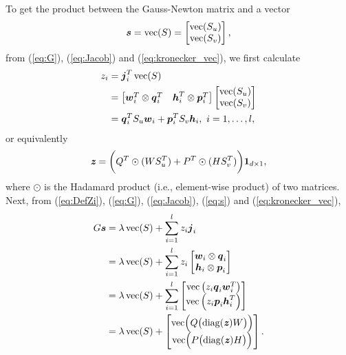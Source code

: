 To get the product between the Gauss-Newton matrix and a vector 
\begin{equation*}
\boldsymbol{s} = \operatorname*{vec}(S) = \begin{bmatrix}\operatorname*{vec}(S_u)\\ \operatorname*{vec}(S_v)\end{bmatrix}, 
\end{equation*}
from (\ref{eq:G}), (\ref{eq:Jacob}) and (\ref{eq:kronecker_vec}), we first calculate
\begin{equation}
\begin{aligned}
    z_i&= \boldsymbol{j}_i^T \operatorname*{vec}(S)\\
    &=\begin{bmatrix} \boldsymbol{w}_i^T\otimes\boldsymbol{q}_i^T & \boldsymbol{h}_i^T\otimes\boldsymbol{p}_i^T \end{bmatrix}\begin{bmatrix}\operatorname*{vec}(S_u)\\ \operatorname*{vec}(S_v)\end{bmatrix}\\
    &=\boldsymbol{q}_i^T S_u \boldsymbol{w}_i + \boldsymbol{p}_i^T S_v \boldsymbol{h}_i, \text{ }i=1,\dots,l
    \label{eq:DefZi},
\end{aligned}
\end{equation}
or equivalently
\begin{equation}
    \textbf{\textit{z}} = \biggl({Q^T}\odot{(WS_u^T)}+{P^T}\odot{(HS_v^T)}\biggr) \boldsymbol{1}_{d\times 1}
    \label{eq:CalcZ},
\end{equation}
where $\odot$ is the Hadamard product (i.e., element-wise product) of two matrices.  Next, from (\ref{eq:DefZi}), (\ref{eq:G}), (\ref{eq:Jacob}), (\ref{eq:s}) and  (\ref{eq:kronecker_vec}),
\begin{align}
    G \boldsymbol{s}         &= \lambda \operatorname*{vec}(S) + \sum_{i=1}^l z_i \boldsymbol{j}_i \nonumber\\
                  &= \lambda \operatorname*{vec}(S) + \sum_{i=1}^l z_i \begin{bmatrix} \boldsymbol{w}_i\otimes \boldsymbol{q}_i \\ \boldsymbol{h}_i\otimes \boldsymbol{p}_i \end{bmatrix} \nonumber \\
                  &= \lambda \operatorname*{vec}(S) +  \sum_{i=1}^l \begin{bmatrix}\operatorname*{vec}\left(z_i \boldsymbol{q}_i \boldsymbol{w}_i^T\right) \\ \operatorname*{vec}\left(z_i \boldsymbol{p}_i \boldsymbol{h}_i^T\right)\end{bmatrix} \nonumber  \\
                  &= \lambda \operatorname*{vec}(S) +  \begin{bmatrix}\operatorname*{vec} \Bigl ( Q \bigl(\operatorname*{diag}(\textbf{\textit{z}}) W \bigr) \Bigr)\\\operatorname*{vec} \Bigl ( P \bigl ( \operatorname*{diag}(\textbf{\textit{z}}) H \bigr) \Bigr)\end{bmatrix} \label{eq:Hv}.
\end{align}

